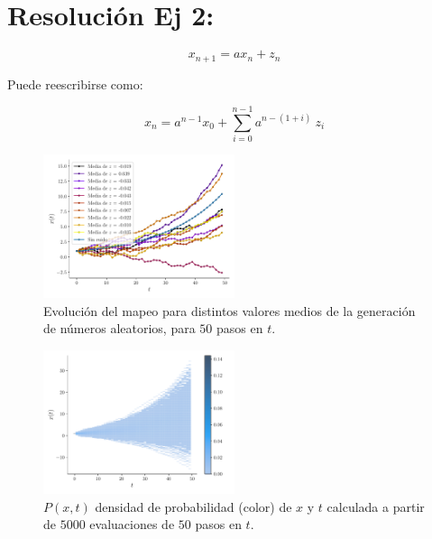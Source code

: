 \documentclass[twocolumn,aps,prl]{revtex4-1}
\newcommand{\nSimulacionesB}{5000}
\newcommand{\Nsteps}{50}
\newcommand*\sepline{%
  \begin{center}
    \rule[1ex]{.5\textwidth}{.5pt}
  \end{center}}
\begin{document}

\section{Resolución Ej 2:}


\begin{equation}\label{ec:map01}
  x_{n+1} = a x_n + z_n
\end{equation}

Puede reescribirse como:

\begin{equation}\label{ec:map01-r}
  x_n = a^{n-1} x_0 + \sum_{i=0}^{n-1} a^{n-(1+i)} \ z_i
\end{equation}

\begin{figure}  
  \centering  
  \includegraphics[width=0.5\textwidth]{figuras/ex02-mapeo.pdf}
  \caption{Evolución del mapeo para distintos valores medios de la generación de números aleatorios, para $\Nsteps$ pasos en $t$.}
  \label{fig:ultima_iteracion}
\end{figure}

\begin{figure}  
  \centering  
  \includegraphics[width=0.5\textwidth]{figuras/ex02-histograma.pdf}
  \caption{$P(x,t)$ densidad de probabilidad (color) de $x$ y $t$ calculada a partir de $\nSimulacionesB$ evaluaciones de $\Nsteps$ pasos en $t$.}
  \label{fig:ultima_iteracion}
\end{figure}
\end{document}
